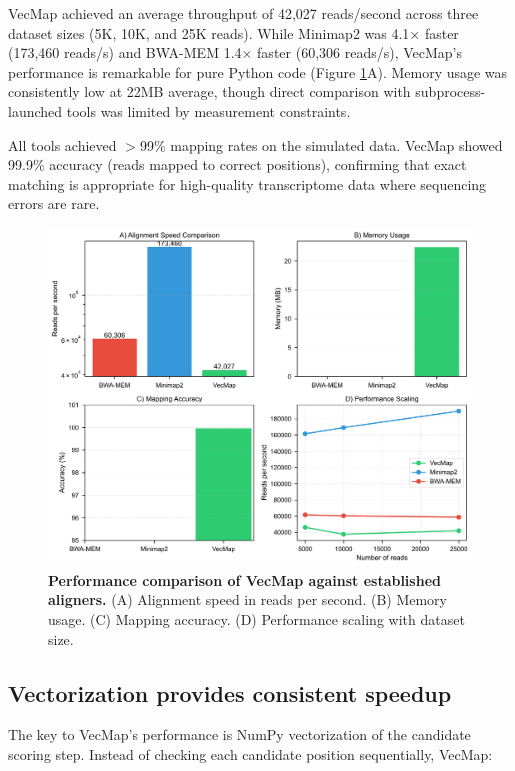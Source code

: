 \documentclass[12pt]{article}
\begin{document}
VecMap achieved an average throughput of 42,027 reads/second across three dataset sizes (5K, 10K, and 25K reads). While Minimap2 was 4.1× faster (173,460 reads/s) and BWA-MEM 1.4× faster (60,306 reads/s), VecMap's performance is remarkable for pure Python code (Figure \ref{fig:performance}A). Memory usage was consistently low at 22MB average, though direct comparison with subprocess-launched tools was limited by measurement constraints.

All tools achieved $>$99\% mapping rates on the simulated data. VecMap showed 99.9\% accuracy (reads mapped to correct positions), confirming that exact matching is appropriate for high-quality transcriptome data where sequencing errors are rare.

\begin{figure}[H]
\centering
\includegraphics[width=\textwidth]{docs/figures/figure1_performance_comparison.pdf}
\caption{\textbf{Performance comparison of VecMap against established aligners.} (A) Alignment speed in reads per second. (B) Memory usage. (C) Mapping accuracy. (D) Performance scaling with dataset size.}
\label{fig:performance}
\end{figure}

\subsection{Vectorization provides consistent speedup}

The key to VecMap's performance is NumPy vectorization of the candidate scoring step. Instead of checking each candidate position sequentially, VecMap:
\end{document}
